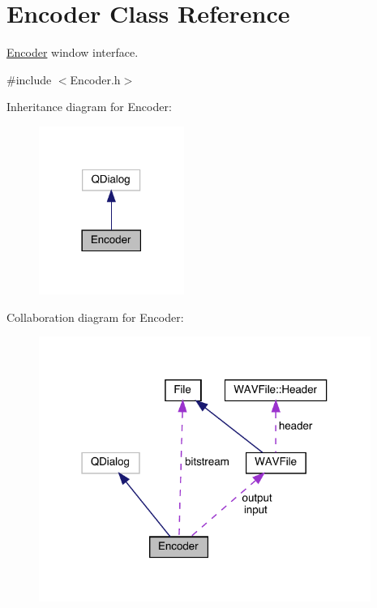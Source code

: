 \hypertarget{class_encoder}{}\section{Encoder Class Reference}
\label{class_encoder}


\hyperlink{class_encoder}{Encoder} window interface.  




{\ttfamily \#include $<$Encoder.\+h$>$}



Inheritance diagram for Encoder\+:
\nopagebreak
\begin{figure}[H]
\begin{center}
\leavevmode
\includegraphics[width=134pt]{class_encoder__inherit__graph}
\end{center}
\end{figure}


Collaboration diagram for Encoder\+:
\nopagebreak
\begin{figure}[H]
\begin{center}
\leavevmode
\includegraphics[width=307pt]{class_encoder__coll__graph}
\end{center}
\end{figure}
